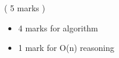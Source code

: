 \begin{INUTILE}
\begin{markingScheme}{	\vspace{15pt}
	( 5 marks )

	\vspace{10pt}
	\begin{itemize}
	\item 4 marks for algorithm
	\item 1 mark for O(n) reasoning
	\end{itemize}
}
\end{markingScheme}
  
\end{INUTILE}
